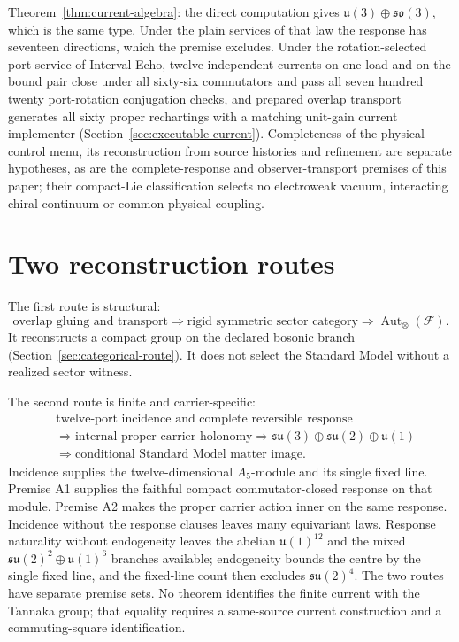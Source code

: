 \documentclass[11pt]{article}
\begin{document}
Theorem~\ref{thm:current-algebra}: the direct computation gives
\(\mathfrak u(3)\oplus\mathfrak{so}(3)\), which is the same type. Under the
plain services of that law the response has seventeen directions, which the
premise excludes. Under the rotation-selected port service of Interval Echo,
twelve independent currents on one load and on the bound pair close under
all sixty-six commutators and pass all seven hundred twenty port-rotation
conjugation checks, and prepared overlap transport generates all sixty proper
rechartings with a matching unit-gain current implementer
(Section~\ref{sec:executable-current}). Completeness of the physical control
menu, its reconstruction from source histories and refinement are separate
hypotheses, as are the complete-response and observer-transport premises of
this paper; their compact-Lie classification selects no electroweak vacuum,
interacting chiral continuum or common physical coupling.

\section{Two reconstruction routes}
\label{sec:two-routes}

The first route is structural:
\[
\text{overlap gluing and transport}
\Longrightarrow
\text{rigid symmetric sector category}
\Longrightarrow
\operatorname{Aut}_{\otimes}(\mathcal F).
\]
It reconstructs a compact group on the declared bosonic branch
(Section~\ref{sec:categorical-route}). It does not select the Standard Model
without a realized sector witness.

The second route is finite and carrier-specific:
\[
\begin{split}
&\text{twelve-port incidence and complete reversible response}\\
&\Longrightarrow\text{internal proper-carrier holonomy}
\Longrightarrow
\mathfrak{su}(3)\oplus\mathfrak{su}(2)\oplus\mathfrak u(1)\\
&\Longrightarrow
\text{conditional Standard Model matter image}.
\end{split}
\]
Incidence supplies the twelve-dimensional \(A_5\)-module and its single
fixed line. Premise A1 supplies the faithful compact commutator-closed
response on that module. Premise A2 makes the proper carrier action inner on
the same response. Incidence without the response clauses leaves many
equivariant laws. Response naturality without endogeneity leaves the abelian
\(\mathfrak u(1)^{12}\) and the mixed
\(\mathfrak{su}(2)^{2}\oplus\mathfrak u(1)^{6}\) branches available;
endogeneity bounds the centre by the single fixed line, and the fixed-line
count then excludes \(\mathfrak{su}(2)^{4}\). The two routes have separate
premise sets. No theorem identifies the finite current with the Tannaka
group; that equality requires a same-source current construction and a
commuting-square identification.
\end{document}
